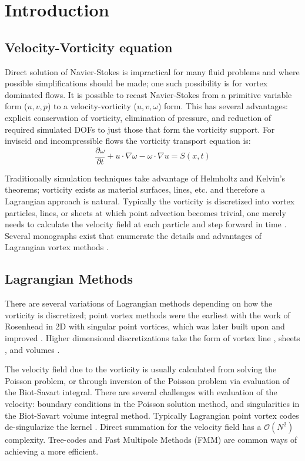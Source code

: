 \documentclass[letterpaper,12pt]{report}
\newcommand{\ben}[1]{\begin{equation}\label{#1}}
\newcommand{\ee}{\end{equation}}
\begin{document}
\chapter{Introduction}
\section{Velocity-Vorticity equation}
Direct solution of Navier-Stokes is impractical for many fluid problems and where possible simplifications should be made; one such possibility is for vortex dominated flows. It is possible to recast Navier-Stokes from a primitive variable form ($u,v,p$) to a velocity-vorticity ($u,v,\omega$) form. This has several advantages: explicit conservation of vorticity, elimination of pressure, and reduction of required simulated DOFs to just those that form the vorticity support. For inviscid and incompressible flows the vorticity transport equation is:
\ben{VV3D} \frac{\partial \omega}{\partial t} + u \cdot \nabla \omega - \omega \cdot \nabla u = S(x,t)\ee

Traditionally simulation techniques take advantage of Helmholtz and Kelvin's theorems; vorticity exists as material surfaces, lines, etc. and therefore a Lagrangian approach is natural. Typically the vorticity is discretized into vortex particles, lines, or sheets at which point advection becomes trivial, one merely needs to calculate the velocity field at each particle and step forward in time \cite{Strain1996,MoussaCarley2008,KoumLeonard1995}. Several monographs exist that enumerate the details and advantages of Lagrangian vortex methods \cite{Lugt1983,Saffman1992,Speziale1987}.

\section{Lagrangian Methods}
There are several variations of Lagrangian methods depending on how the vorticity is discretized; point vortex methods were the earliest with the work of Rosenhead \cite{Point1} in 2D with singular point vortices, which was later built upon and improved \cite{Point2,Point3,Point4,Point5,Point6}. Higher dimensional discretizations take the form of vortex line \cite{Line1,Line2,Line3,Line4}, sheets \cite{Sheet1,Sheet2,Sheet3}, and volumes \cite{Volumes1,Volumes2,Volumes3}.

The velocity field due to the vorticity is usually calculated from solving the Poisson problem, or through inversion of the Poisson problem via evaluation of the Biot-Savart integral. There are several challenges with evaluation of the velocity: boundary conditions in the Poisson solution method, and singularities in the Biot-Savart volume integral method. Typically Lagrangian point vortex codes de-singularize the kernel \cite{Rosenhead1930,Moore1972}. Direct summation for the velocity field has a $\mathcal{O}(N^2)$ complexity. Tree-codes \cite{LindsayKrasny2001} and Fast Multipole Methods (FMM) \cite{Strain1997} are common ways of achieving a more efficient.
\end{document}
